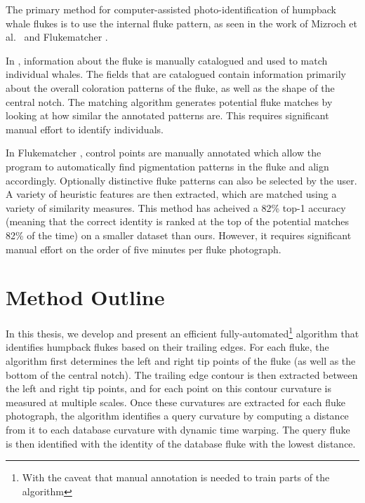 The primary method for computer-assisted photo-identification of humpback whale flukes is to use the internal fluke pattern, as seen in the work of Mizroch et al.\ \cite{mizroch1990computer} and Flukematcher \cite{kniest2010fluke}. 

In \cite{mizroch1990computer}, information about the fluke is manually catalogued and used to match individual whales. 
The fields that are catalogued contain information primarily about the overall coloration patterns of the fluke, as well as the shape of the central notch. 
The matching algorithm generates potential fluke matches by looking at how similar the annotated patterns are.
This requires significant manual effort to identify individuals.

In Flukematcher \cite{kniest2010fluke}, control points are manually annotated which allow the program to automatically find pigmentation patterns in the fluke and align accordingly.
Optionally distinctive fluke patterns can also be selected by the user.
A variety of heuristic features are then extracted, which are matched using a variety of similarity measures.
This method has acheived a 82\% top-1 accuracy (meaning that the correct identity is ranked at the top of the potential matches 82\% of the time) on a smaller dataset than ours.
However, it requires significant manual effort on the order of five minutes per fluke photograph.

\section{Method Outline}


In this thesis, we develop and present an efficient fully-automated\footnote{With the caveat that manual annotation is needed to train parts of the algorithm} algorithm that identifies humpback flukes based on their trailing edges.
For each fluke, the algorithm first determines the left and right tip points of the fluke (as well as the bottom of the central notch). 
The trailing edge contour is then extracted between the left and right tip points, and for each point on this contour curvature is measured at multiple scales.
Once these curvatures are extracted for each fluke photograph, the algorithm identifies a query curvature by computing a distance from it to each database curvature with dynamic time warping.
The query fluke is then identified with the identity of the database fluke with the lowest distance.

